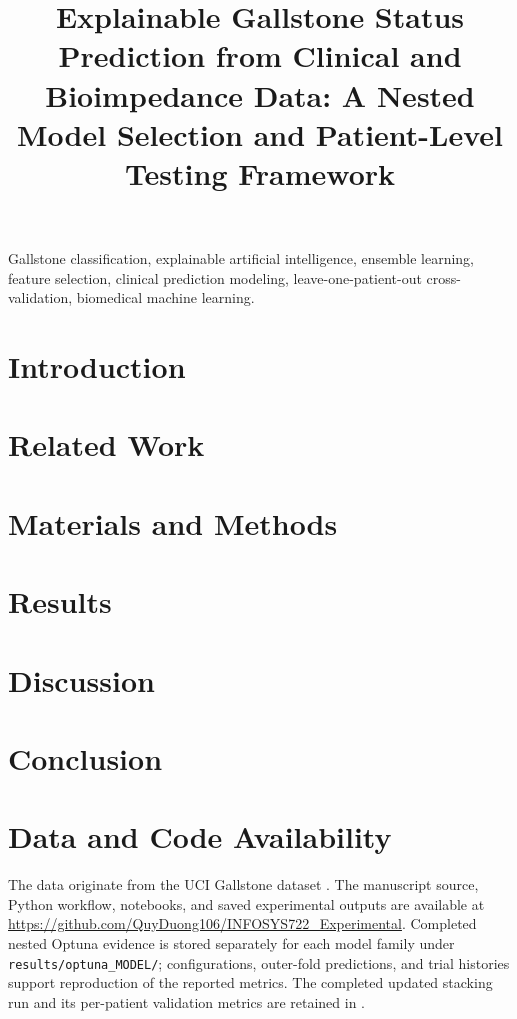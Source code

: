 \documentclass[conference]{IEEEtran}
\title{Explainable Gallstone Status Prediction from Clinical and Bioimpedance Data: A Nested Model Selection and Patient-Level Testing Framework}
\author{\IEEEauthorblockN{Duong Nguyen}\IEEEauthorblockA{University of Auckland}}
\date{}
\let\parencite\citep
\begin{document}
\maketitle
\begin{abstract}

\end{abstract}
\begin{IEEEkeywords}
Gallstone classification, explainable artificial intelligence,
ensemble learning, feature selection, clinical prediction modeling,
leave-one-patient-out cross-validation, biomedical machine learning.
\end{IEEEkeywords}

\section{Introduction}\label{sec:introduction}


\section{Related Work}\label{sec:related-work}


\section{Materials and Methods}\label{sec:methods}


\section{Results}\label{sec:results}

\section{Discussion}\label{sec:discussion}


\section{Conclusion}\label{sec:conclusion}


\section*{Data and Code Availability}
The data originate from the UCI Gallstone dataset \parencite{uci2025gallstone}. The manuscript source, Python workflow, notebooks, and saved experimental outputs are available at \url{https://github.com/QuyDuong106/INFOSYS722_Experimental}. Completed nested Optuna evidence is stored separately for each model family under \texttt{results/optuna\_MODEL/}; configurations, outer-fold predictions, and trial histories support reproduction of the reported metrics. The completed updated stacking run and its per-patient validation metrics are retained in .




\end{document}
